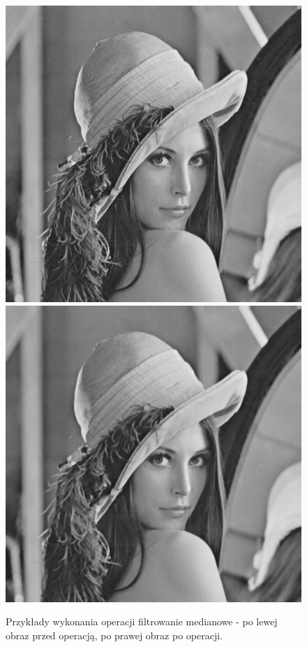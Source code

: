 \documentclass{article}
\begin{document}
\begin{figure}[!htb]
\includegraphics[scale=0.2]{img/lena_8bit.png}  
\includegraphics[scale=0.2]{img/_Filtr_Medianowy_lena_8bit.png} 
\caption{Przykłady wykonania operacji filtrowanie medianowe - po lewej obraz przed operacją, po prawej obraz po operacji. }
\end{figure}
\end{document}
